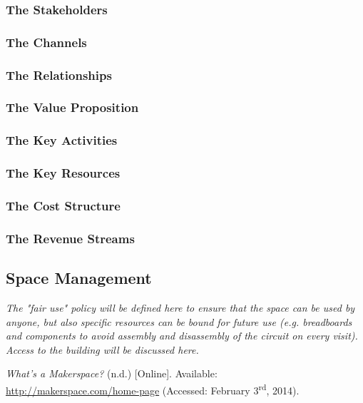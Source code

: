 \documentclass[a4paper, 11pt]{article}
\begin{document}
\subsubsection{The Stakeholders}

\subsubsection{The Channels}

\subsubsection{The Relationships}

\subsubsection{The Value Proposition}

\subsubsection{The Key Activities}

\subsubsection{The Key Resources}

\subsubsection{The Cost Structure}

\subsubsection{The Revenue Streams}


\subsection{Space Management}
\textit{The "fair use" policy will be defined here to ensure that the space can be used by anyone, but also specific resources can be bound for future use (e.g. breadboards and components to avoid assembly and disassembly of the circuit on every visit). Access to the building will be discussed here.}\cite{mobilehealth}

\newpage

\begin{thebibliography}{9}
     \emph{What’s a Makerspace?} (n.d.) [Online]. Available: \\ \href{http://makerspace.com/home-page}{http://makerspace.com/home-page} (Accessed: February 3\textsuperscript{rd}, 2014).
\end{thebibliography}
\end{document}
